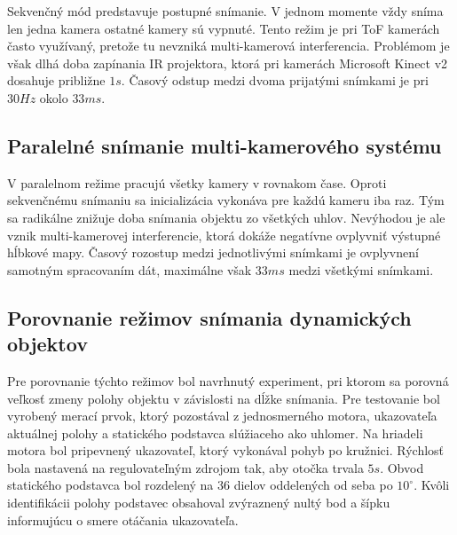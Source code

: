 Sekvenčný mód predstavuje postupné snímanie. V jednom momente vždy sníma len jedna kamera ostatné kamery sú vypnuté. Tento režim je pri ToF kamerách často využívaný, pretože tu nevzniká multi-kamerová interferencia. Problémom je však dlhá doba zapínania IR projektora, ktorá pri kamerách Microsoft Kinect v2 dosahuje približne $1s$. Časový odstup medzi dvoma prijatými snímkami je pri $30Hz$ okolo $33ms$.

\subsection{Paralelné snímanie multi-kamerového systému}

V paralelnom režime pracujú všetky kamery v rovnakom čase. Oproti sekvenčnému snímaniu sa inicializácia vykonáva pre každú kameru iba raz. Tým sa radikálne znižuje doba snímania objektu zo všetkých uhlov. Nevýhodou je ale vznik multi-kamerovej interferencie, ktorá dokáže negatívne ovplyvniť výstupné hĺbkové mapy. Časový rozostup medzi jednotlivými snímkami je ovplyvnení samotným spracovaním dát, maximálne však $33ms$ medzi všetkými snímkami. 

\subsection{Porovnanie režimov snímania dynamických objektov}
\label{sec:serial_parallel}
Pre porovnanie týchto režimov bol navrhnutý experiment, pri ktorom sa porovná veľkosť zmeny polohy objektu v závislosti na dĺžke snímania. Pre testovanie bol vyrobený merací prvok, ktorý pozostával z jednosmerného motora, ukazovateľa aktuálnej polohy a statického podstavca slúžiaceho ako uhlomer. Na hriadeli motora bol pripevnený ukazovateľ, ktorý vykonával pohyb po kružnici. Rýchlosť bola nastavená na regulovateľným zdrojom tak, aby otočka trvala $5s$. Obvod statického podstavca bol rozdelený na 36 dielov oddelených od seba po $10^\circ$. Kvôli identifikácii polohy podstavec obsahoval zvýraznený nultý bod a šípku informujúcu o smere otáčania ukazovateľa.  


